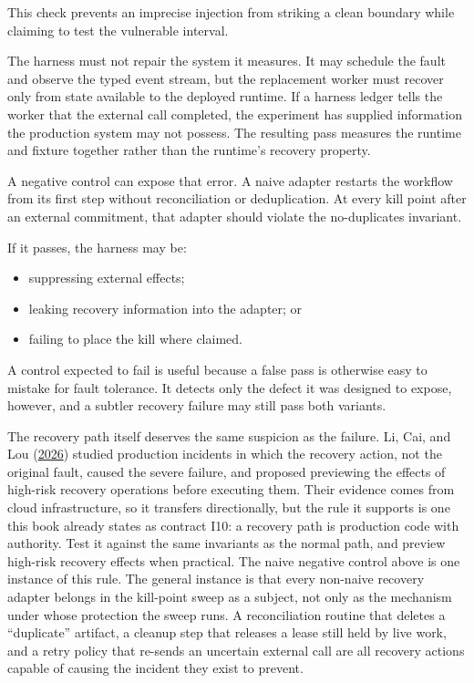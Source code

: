 This check prevents an imprecise injection from striking a clean boundary while claiming to test the vulnerable interval.

The harness must not repair the system it measures. It may schedule the fault and observe the typed event stream, but the replacement worker must recover only from state available to the deployed runtime. If a harness ledger tells the worker that the external call completed, the experiment has supplied information the production system may not possess. The resulting pass measures the runtime and fixture together rather than the runtime's recovery property.

A negative control can expose that error. A naive adapter restarts the workflow from its first step without reconciliation or deduplication. At every kill point after an external commitment, that adapter should violate the no-duplicates invariant.


If it passes, the harness may be:

\begin{itemize}
\tightlist
\item
  suppressing external effects;
\item
  leaking recovery information into the adapter; or
\item
  failing to place the kill where claimed.
\end{itemize}

A control expected to fail is useful because a false pass is otherwise easy to mistake for fault tolerance. It detects only the defect it was designed to expose, however, and a subtler recovery failure may still pass both variants.

The recovery path itself deserves the same suspicion as the failure. Li, Cai, and Lou (\href{https://www.usenix.org/conference/nsdi26/presentation/li-zhenyu}{2026}) studied production incidents in which the recovery action, not the original fault, caused the severe failure, and proposed previewing the effects of high-risk recovery operations before executing them. Their evidence comes from cloud infrastructure, so it transfers directionally, but the rule it supports is one this book already states as contract I10: a recovery path is production code with authority. Test it against the same invariants as the normal path, and preview high-risk recovery effects when practical. The naive negative control above is one instance of this rule. The general instance is that every non-naive recovery adapter belongs in the kill-point sweep as a subject, not only as the mechanism under whose protection the sweep runs. A reconciliation routine that deletes a ``duplicate'' artifact, a cleanup step that releases a lease still held by live work, and a retry policy that re-sends an uncertain external call are all recovery actions capable of causing the incident they exist to prevent.

